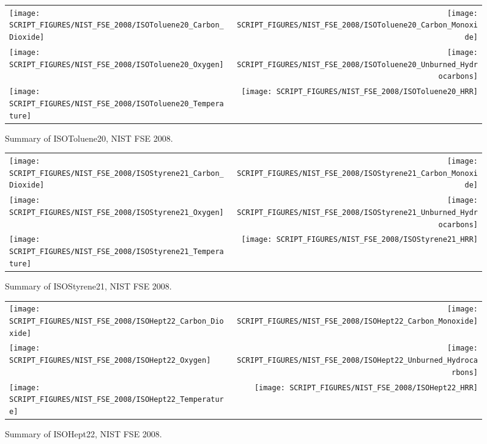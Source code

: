 \begin{figure}[p]
\begin{tabular*}{\textwidth}{l@{\extracolsep{\fill}}r}
\texttt{[image: SCRIPT\_FIGURES/NIST\_FSE\_2008/ISOToluene20\_Carbon\_Dioxide]} &
\texttt{[image: SCRIPT\_FIGURES/NIST\_FSE\_2008/ISOToluene20\_Carbon\_Monoxide]} \\
\texttt{[image: SCRIPT\_FIGURES/NIST\_FSE\_2008/ISOToluene20\_Oxygen]} &
\texttt{[image: SCRIPT\_FIGURES/NIST\_FSE\_2008/ISOToluene20\_Unburned\_Hydrocarbons]} \\
\texttt{[image: SCRIPT\_FIGURES/NIST\_FSE\_2008/ISOToluene20\_Temperature]} &
\texttt{[image: SCRIPT\_FIGURES/NIST\_FSE\_2008/ISOToluene20\_HRR]}
\end{tabular*}
\caption[Summary of ISOToluene20, NIST FSE 2008]{Summary of ISOToluene20, NIST FSE 2008.}
\label{NIST_FSE_1994_ISOToluene20}
\end{figure}

\begin{figure}[p]
\begin{tabular*}{\textwidth}{l@{\extracolsep{\fill}}r}
\texttt{[image: SCRIPT\_FIGURES/NIST\_FSE\_2008/ISOStyrene21\_Carbon\_Dioxide]} &
\texttt{[image: SCRIPT\_FIGURES/NIST\_FSE\_2008/ISOStyrene21\_Carbon\_Monoxide]} \\
\texttt{[image: SCRIPT\_FIGURES/NIST\_FSE\_2008/ISOStyrene21\_Oxygen]} &
\texttt{[image: SCRIPT\_FIGURES/NIST\_FSE\_2008/ISOStyrene21\_Unburned\_Hydrocarbons]} \\
\texttt{[image: SCRIPT\_FIGURES/NIST\_FSE\_2008/ISOStyrene21\_Temperature]} &
\texttt{[image: SCRIPT\_FIGURES/NIST\_FSE\_2008/ISOStyrene21\_HRR]}
\end{tabular*}
\caption[Summary of ISOStyrene21, NIST FSE 2008]{Summary of ISOStyrene21, NIST FSE 2008.}
\label{NIST_FSE_1994_ISOStyrene21}
\end{figure}

\begin{figure}[p]
\begin{tabular*}{\textwidth}{l@{\extracolsep{\fill}}r}
\texttt{[image: SCRIPT\_FIGURES/NIST\_FSE\_2008/ISOHept22\_Carbon\_Dioxide]} &
\texttt{[image: SCRIPT\_FIGURES/NIST\_FSE\_2008/ISOHept22\_Carbon\_Monoxide]} \\
\texttt{[image: SCRIPT\_FIGURES/NIST\_FSE\_2008/ISOHept22\_Oxygen]} &
\texttt{[image: SCRIPT\_FIGURES/NIST\_FSE\_2008/ISOHept22\_Unburned\_Hydrocarbons]} \\
\texttt{[image: SCRIPT\_FIGURES/NIST\_FSE\_2008/ISOHept22\_Temperature]} &
\texttt{[image: SCRIPT\_FIGURES/NIST\_FSE\_2008/ISOHept22\_HRR]}
\end{tabular*}
\caption[Summary of ISOHept22, NIST FSE 2008]{Summary of ISOHept22, NIST FSE 2008.}
\label{NIST_FSE_1994_ISOHept22}
\end{figure}

